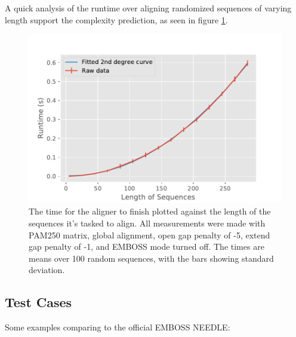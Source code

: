 \documentclass{article}
\begin{document}
A quick analysis of the runtime over aligning randomized sequences of varying length support the complexity prediction, as seen in figure \ref{fig:length_vs_time}.

\begin{figure}[h]
	\includegraphics[width=\columnwidth]{timefig}
	\caption{The time for the aligner to finish plotted against the length of the sequences it's tasked to align. All measurements were made with PAM250 matrix, global alignment, open gap penalty of -5, extend gap penalty of -1, and EMBOSS mode turned off. The times are means over 100 random sequences, with the bars showing standard deviation.}
	\label{fig:length_vs_time}
\end{figure}

\subsection*{Test Cases}
Some examples comparing to the official EMBOSS NEEDLE\cite{EMBOSS}:
\end{document}
